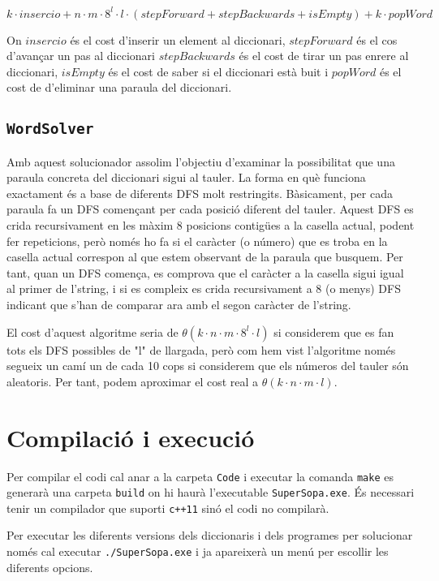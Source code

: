 \documentclass{article}
\begin{document}
\[ k·insercio + n·m·8^l·l·(stepForward + stepBackwards + isEmpty) + k·popWord \]

On $insercio$ és el cost d'inserir un element al diccionari, $stepForward$ és el cos d'avançar un pas al diccionari $stepBackwards$ és el cost de tirar un pas enrere al diccionari, $isEmpty$ és el cost de saber si el diccionari està buit i $popWord$ és el
cost de d'eliminar una paraula del diccionari.

\subsection{\texttt{WordSolver}}

Amb aquest solucionador assolim l'objectiu d'examinar la possibilitat que una paraula concreta del diccionari sigui al tauler.
La forma en què funciona exactament és a base de diferents DFS molt restringits. Bàsicament, per cada paraula fa un DFS començant per cada posició diferent del tauler.
Aquest DFS es crida recursivament en les màxim 8 posicions contigües a la casella actual, podent fer repeticions, però només ho fa si el caràcter (o número) que es troba en la casella actual correspon al que estem observant de la paraula que busquem.
Per tant, quan un DFS comença, es comprova que el caràcter a la casella sigui igual al primer de l'string, i si es compleix es crida recursivament a 8 (o menys) DFS indicant que s'han de comparar ara amb el segon caràcter de l'string.

El cost d'aquest algoritme seria de $\theta(k·n·m·8^l·l)$ si considerem que es fan tots els DFS possibles de "l" de llargada, però com hem vist l'algoritme només segueix un camí un de cada 10 cops si considerem que els números del tauler són aleatoris.
Per tant, podem aproximar el cost real a $\theta(k·n·m·l)$.

\section{Compilació i execució}

Per compilar el codi cal anar a la carpeta \verb|Code| i executar la comanda \verb|make| es generarà una carpeta \verb|build| on hi haurà l'executable \verb|SuperSopa.exe|. És necessari tenir un compilador que suporti \verb|c++11| sinó el codi no compilarà.

Per executar les diferents versions dels diccionaris i dels programes per solucionar només cal executar \verb|./SuperSopa.exe| i ja apareixerà un menú per escollir les diferents opcions. 
\end{document}
